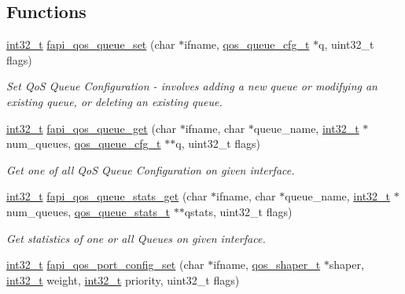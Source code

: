 \subsection*{Functions}
\begin{DoxyCompactItemize}
\item 
\hyperlink{commondefs_8h_a32f2e37ee053cf2ce8ca28d1f74630e5}{int32\-\_\-t} \hyperlink{group__FAPI__QOS__QUEUE_gab200a6c190efb8ff569a9a83a2e2a39e}{fapi\-\_\-qos\-\_\-queue\-\_\-set} (char $\ast$ifname, \hyperlink{group__FAPI__QOS__QUEUE_gaa27a8975bf3ed923f280f804086e1e4e}{qos\-\_\-queue\-\_\-cfg\-\_\-t} $\ast$q, uint32\-\_\-t flags)
\begin{DoxyCompactList}\small\item\em Set Qo\-S Queue Configuration -\/ involves adding a new queue or modifying an existing queue, or deleting an existing queue. \end{DoxyCompactList}\item 
\hyperlink{commondefs_8h_a32f2e37ee053cf2ce8ca28d1f74630e5}{int32\-\_\-t} \hyperlink{group__FAPI__QOS__QUEUE_ga727ee91ab59e9b90747c24ad946c08a2}{fapi\-\_\-qos\-\_\-queue\-\_\-get} (char $\ast$ifname, char $\ast$queue\-\_\-name, \hyperlink{commondefs_8h_a32f2e37ee053cf2ce8ca28d1f74630e5}{int32\-\_\-t} $\ast$num\-\_\-queues, \hyperlink{group__FAPI__QOS__QUEUE_gaa27a8975bf3ed923f280f804086e1e4e}{qos\-\_\-queue\-\_\-cfg\-\_\-t} $\ast$$\ast$q, uint32\-\_\-t flags)
\begin{DoxyCompactList}\small\item\em Get one of all Qo\-S Queue Configuration on given interface. \end{DoxyCompactList}\item 
\hyperlink{commondefs_8h_a32f2e37ee053cf2ce8ca28d1f74630e5}{int32\-\_\-t} \hyperlink{group__FAPI__QOS__QUEUE_gadc2ed3ac56edaa5cdb56e65f6a737aec}{fapi\-\_\-qos\-\_\-queue\-\_\-stats\-\_\-get} (char $\ast$ifname, char $\ast$queue\-\_\-name, \hyperlink{commondefs_8h_a32f2e37ee053cf2ce8ca28d1f74630e5}{int32\-\_\-t} $\ast$num\-\_\-queues, \hyperlink{structqos__queue__stats__t}{qos\-\_\-queue\-\_\-stats\-\_\-t} $\ast$$\ast$qstats, uint32\-\_\-t flags)
\begin{DoxyCompactList}\small\item\em Get statistics of one or all Queues on given interface. \end{DoxyCompactList}\item 
\hyperlink{commondefs_8h_a32f2e37ee053cf2ce8ca28d1f74630e5}{int32\-\_\-t} \hyperlink{group__FAPI__QOS__QUEUE_ga689e45276a2ec8a97f4fdace1360aafa}{fapi\-\_\-qos\-\_\-port\-\_\-config\-\_\-set} (char $\ast$ifname, \hyperlink{group__FAPI__QOS__QUEUE_ga05ce7ada7ae20b289d4e675ad099c8f0}{qos\-\_\-shaper\-\_\-t} $\ast$shaper, \hyperlink{commondefs_8h_a32f2e37ee053cf2ce8ca28d1f74630e5}{int32\-\_\-t} weight, \hyperlink{commondefs_8h_a32f2e37ee053cf2ce8ca28d1f74630e5}{int32\-\_\-t} priority, uint32\-\_\-t flags)

\end{DoxyCompactItemize}
